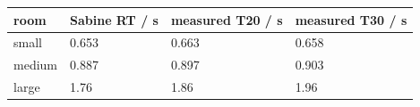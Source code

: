 \documentclass[]{scrreprt}
\begin{document}
\begin{longtable}[c]{@{}llll@{}}
\toprule
\begin{minipage}[b]{0.22\columnwidth}\raggedright\strut
room
\strut\end{minipage} &
\begin{minipage}[b]{0.18\columnwidth}\raggedright\strut
Sabine RT / s
\strut\end{minipage} &
\begin{minipage}[b]{0.22\columnwidth}\raggedright\strut
measured T20 / s
\strut\end{minipage} &
\begin{minipage}[b]{0.27\columnwidth}\raggedright\strut
measured T30 / s
\strut\end{minipage}\tabularnewline
\midrule
\endhead
\begin{minipage}[t]{0.22\columnwidth}\raggedright\strut
small
\strut\end{minipage} &
\begin{minipage}[t]{0.18\columnwidth}\raggedright\strut
0.653
\strut\end{minipage} &
\begin{minipage}[t]{0.22\columnwidth}\raggedright\strut
0.663
\strut\end{minipage} &
\begin{minipage}[t]{0.27\columnwidth}\raggedright\strut
0.658
\strut\end{minipage}\tabularnewline
\begin{minipage}[t]{0.22\columnwidth}\raggedright\strut
medium
\strut\end{minipage} &
\begin{minipage}[t]{0.18\columnwidth}\raggedright\strut
0.887
\strut\end{minipage} &
\begin{minipage}[t]{0.22\columnwidth}\raggedright\strut
0.897
\strut\end{minipage} &
\begin{minipage}[t]{0.27\columnwidth}\raggedright\strut
0.903
\strut\end{minipage}\tabularnewline
\begin{minipage}[t]{0.22\columnwidth}\raggedright\strut
large
\strut\end{minipage} &
\begin{minipage}[t]{0.18\columnwidth}\raggedright\strut
1.76
\strut\end{minipage} &
\begin{minipage}[t]{0.22\columnwidth}\raggedright\strut
1.86
\strut\end{minipage} &
\begin{minipage}[t]{0.27\columnwidth}\raggedright\strut
1.96
\strut\end{minipage}\tabularnewline
\bottomrule
\end{longtable}
\end{document}
